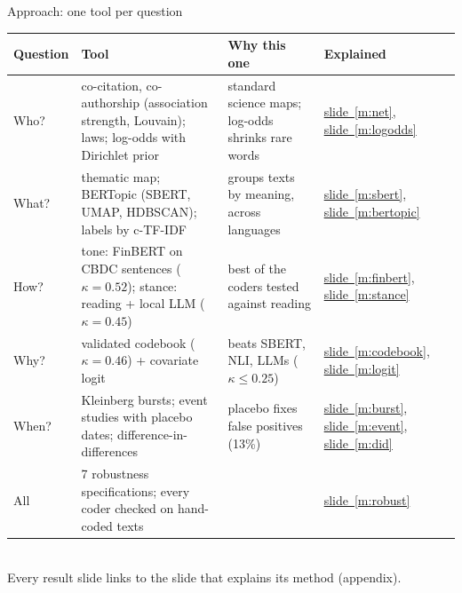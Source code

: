 \documentclass[aspectratio=169,10pt]{beamer}
\newcommand{\usedon}[1]{\hyperref[#1]{\textcolor{c4}{slide~\ref*{#1}}}}
\begin{document}
\begin{frame}{Approach: one tool per question}
\scriptsize
\setlength{\tabcolsep}{4pt}
\begin{tabular}{@{}lp{}p{}l@{}}\toprule
\textbf{Question} & \textbf{Tool} & \textbf{Why this one} & \textbf{Explained}\\\midrule
Who? & co-citation, co-authorship (association strength, Louvain); laws; log-odds with Dirichlet prior & standard science maps; log-odds shrinks rare words & \usedon{m:net}, \usedon{m:logodds}\\
What? & thematic map; \alert{BERTopic} (SBERT, UMAP, HDBSCAN); labels by \alert{c-TF-IDF} & groups texts by meaning, across languages & \usedon{m:sbert}, \usedon{m:bertopic}\\
How? & tone: \alert{FinBERT} on CBDC sentences ($\kappa = 0.52$); stance: reading + \alert{local LLM} ($\kappa = 0.45$) & best of the coders tested against reading & \usedon{m:finbert}, \usedon{m:stance}\\
Why? & \alert{validated codebook} ($\kappa = 0.46$) + \alert{covariate logit} & beats SBERT, NLI, LLMs ($\kappa \le 0.25$) & \usedon{m:codebook}, \usedon{m:logit}\\
When? & \alert{Kleinberg bursts}; \alert{event studies} with placebo dates; \alert{difference-in-differences} & placebo fixes false positives (13\%) & \usedon{m:burst}, \usedon{m:event}, \usedon{m:did}\\\midrule
All & 7 robustness specifications; every coder checked on hand-coded texts & & \usedon{m:robust}\\
\bottomrule\end{tabular}\\[4pt]
\small Every result slide links to the slide that explains its method (appendix).
\end{frame}
\end{document}
